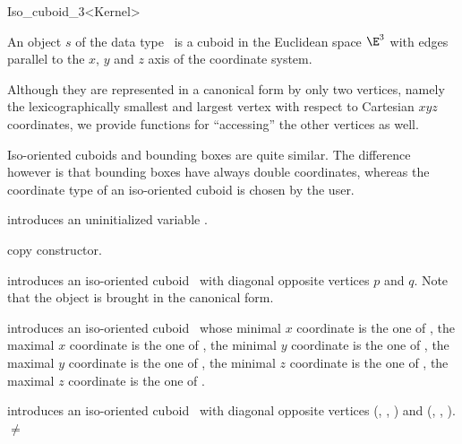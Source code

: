 \begin{ccRefClass} {Iso_cuboid_3<Kernel>}

\ccDefinition  An object $s$ of the data type \ccRefName\ is a
cuboid in the Euclidean space $\E^3$ with edges parallel to the $x$,
$y$ and $z$ axis of the coordinate system.
 
Although they are represented in a canonical form by only two
vertices, namely the lexicographically smallest and largest vertex
with respect to Cartesian $xyz$ coordinates, we provide
functions for ``accessing'' the other vertices as well.

Iso-oriented cuboids and bounding boxes are quite similar. The
difference however is that bounding boxes have always double coordinates, 
whereas the coordinate type of an iso-oriented cuboid is chosen by
the user.

\ccCreation
{}

\ccHidden {}
             {introduces an uninitialized variable \ccVar.}

\ccHidden {}
            {copy constructor.}

            {introduces an iso-oriented cuboid \ccVar\ with diagonal
             opposite vertices $p$ and $q$. Note that the object is 
             brought in the canonical form.}

            {introduces an iso-oriented cuboid \ccVar\ whose
             minimal $x$ coordinate is the one of , the
             maximal $x$ coordinate is the one of , the
             minimal $y$ coordinate is the one of , the
             maximal $y$ coordinate is the one of , the
             minimal $z$ coordinate is the one of , the
             maximal $z$ coordinate is the one of .}

            {introduces an iso-oriented cuboid \ccVar\ with diagonal
             opposite vertices 
             (, , ) and
             (, , ).  
             \ccPrecond {} $\neq$  }



\end{ccRefClass}
